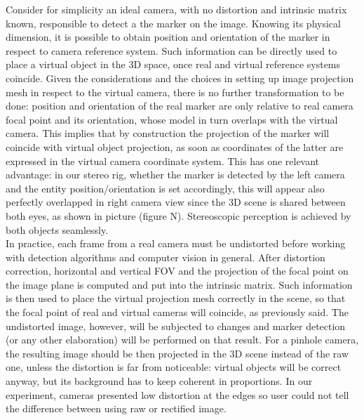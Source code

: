 Consider for simplicity an ideal camera, with no distortion and intrinsic matrix known, responsible to detect a the marker on the image. Knowing its physical dimension, it is possible to obtain position and orientation of the marker in respect to camera reference system. Such information can be directly used to place a virtual object in the 3D space, once real and virtual reference systems coincide. Given the considerations and the choices in setting up image projection mesh in respect to the virtual camera, there is no further transformation to be done: position and orientation of the real marker are only relative to real camera focal point and its orientation, whose model in turn overlaps with the virtual camera. This implies that by construction the projection of the marker will coincide with virtual object projection, as soon as coordinates of the latter are expressed in the virtual camera coordinate system. This has one relevant advantage: in our stereo rig, whether the marker is detected by the left camera and the entity position/orientation is set accordingly, this will appear also perfectly overlapped in right camera view since the 3D scene is shared between both eyes, as shown in picture (figure N). Stereoscopic perception is achieved by both objects seamlessly.\\
In practice, each frame from a real camera must be undistorted before working with detection algorithms and computer vision in general. After distortion correction, horizontal and vertical FOV and the projection of the focal point on the image plane is computed and put into the intrinsic matrix. Such information is then used to place the virtual projection mesh correctly in the scene, so that the focal point of real and virtual cameras will coincide, as previously said. The undistorted image, however, will be subjected to changes and marker detection (or any other elaboration) will be performed on that result. For a pinhole camera, the resulting image should be then projected in the 3D scene instead of the raw one, unless the distortion is far from noticeable: virtual objects will be correct anyway, but its background has to keep coherent in proportions. In our experiment, cameras presented low distortion at the edges so user could not tell the difference between using raw or rectified image.\\
